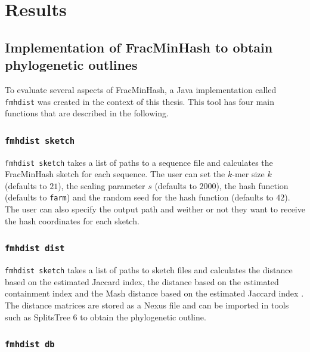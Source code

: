 
\chapter{Results}
  \label{sec:res}

\section{Implementation of FracMinHash to obtain phylogenetic outlines}
To evaluate several aspects of FracMinHash, a Java implementation called
\texttt{fmhdist} was created in the context of this thesis. This tool has four
main functions that are described in the following.

\subsection*{\texttt{fmhdist sketch}}

\texttt{fmhdist sketch} takes a list of paths to a sequence file and calculates
the FracMinHash sketch for each sequence. The user can set the $k$-mer size $k$
(defaults to $21$), the scaling parameter $s$ (defaults to $2000$), the hash
function (defaults to \texttt{farm}) and the random seed for the hash function
(defaults to $42$). The user can also specify the output path and weither or not
they want to receive the hash coordinates for each sketch.

\subsection*{\texttt{fmhdist dist}}

\texttt{fmhdist sketch} takes a list of paths to sketch files and calculates the
distance based on the estimated Jaccard index, the distance based on the
estimated containment index
\cite{heraDerivingConfidenceIntervals2023,irberLightweightCompositionalAnalysis2022}
and the Mash distance based on the estimated Jaccard index
\cite{ondovMashFastGenome2016}. The distance matrices are stored as a Nexus file
and can be imported in tools such as SplitsTree 6 to obtain the phylogenetic
outline.

\subsection*{\texttt{fmhdist db}}

